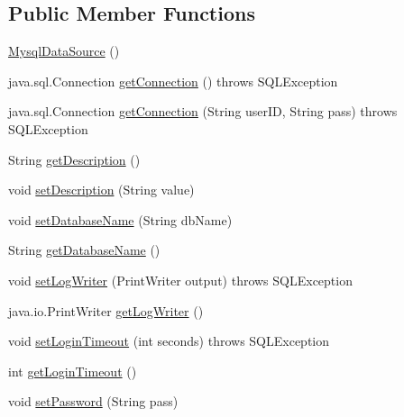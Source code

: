 \subsection*{Public Member Functions}
\begin{DoxyCompactItemize}
\item 
\mbox{\hyperlink{classcom_1_1mysql_1_1cj_1_1jdbc_1_1_mysql_data_source_a693d45a73e9e843ae443fb8d6489f50d}{Mysql\+Data\+Source}} ()
\item 
java.\+sql.\+Connection \mbox{\hyperlink{classcom_1_1mysql_1_1cj_1_1jdbc_1_1_mysql_data_source_a585676b84163ab8ebd4ed84af71a80ea}{get\+Connection}} ()  throws S\+Q\+L\+Exception 
\item 
java.\+sql.\+Connection \mbox{\hyperlink{classcom_1_1mysql_1_1cj_1_1jdbc_1_1_mysql_data_source_ae210ba178fafb65d2f2b57ff6697ae60}{get\+Connection}} (String user\+ID, String pass)  throws S\+Q\+L\+Exception 
\item 
String \mbox{\hyperlink{classcom_1_1mysql_1_1cj_1_1jdbc_1_1_mysql_data_source_a4d031bf01ec1b2c61692181f42025a89}{get\+Description}} ()
\item 
void \mbox{\hyperlink{classcom_1_1mysql_1_1cj_1_1jdbc_1_1_mysql_data_source_a953b80b5083953434de23b4b7853d684}{set\+Description}} (String value)
\item 
void \mbox{\hyperlink{classcom_1_1mysql_1_1cj_1_1jdbc_1_1_mysql_data_source_a61c38c590ddffdefc2eca544a68beb09}{set\+Database\+Name}} (String db\+Name)
\item 
String \mbox{\hyperlink{classcom_1_1mysql_1_1cj_1_1jdbc_1_1_mysql_data_source_a8a77d80a5db8b80a2957cd3b23121e57}{get\+Database\+Name}} ()
\item 
void \mbox{\hyperlink{classcom_1_1mysql_1_1cj_1_1jdbc_1_1_mysql_data_source_a53de4e7ee2a4cffff97cf0432b395fcc}{set\+Log\+Writer}} (Print\+Writer output)  throws S\+Q\+L\+Exception 
\item 
java.\+io.\+Print\+Writer \mbox{\hyperlink{classcom_1_1mysql_1_1cj_1_1jdbc_1_1_mysql_data_source_a89b785e08483618bd420c334652905e6}{get\+Log\+Writer}} ()
\item 
void \mbox{\hyperlink{classcom_1_1mysql_1_1cj_1_1jdbc_1_1_mysql_data_source_abe43a309548e80bb5ecac98c9360a9c3}{set\+Login\+Timeout}} (int seconds)  throws S\+Q\+L\+Exception 
\item 
int \mbox{\hyperlink{classcom_1_1mysql_1_1cj_1_1jdbc_1_1_mysql_data_source_afa817e73b6270e9dd2777fa39328bb82}{get\+Login\+Timeout}} ()
\item 
void \mbox{\hyperlink{classcom_1_1mysql_1_1cj_1_1jdbc_1_1_mysql_data_source_aba660c9f74325976f0a4b217f833f163}{set\+Password}} (String pass)

\end{DoxyCompactItemize}
